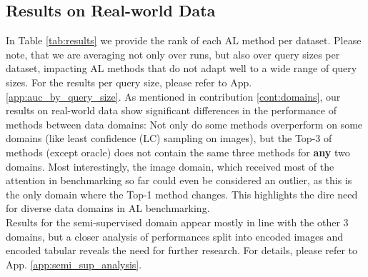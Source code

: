 \documentclass[]{article}
\begin{document}
\subsection{Results on Real-world Data}
In Table \ref{tab:results} we provide the rank of each AL method per dataset. 
Please note, that we are averaging not only over runs, but also over query sizes per dataset, impacting AL methods that do not adapt well to a wide range of query sizes.
For the results per query size, please refer to App. \ref{app:auc_by_query_size}. 
As mentioned in contribution \ref{cont:domains}, our results on real-world data show significant differences in the performance of methods between data domains:
Not only do some methods overperform on some domains (like least confidence (LC) sampling on images), but the Top-3 of methods (except oracle) does not contain the same three methods for \textbf{any} two domains.
Most interestingly, the image domain, which received most of the attention in benchmarking so far could even be considered an outlier, as this is the only domain where the Top-1 method changes.
This highlights the dire need for diverse data domains in AL benchmarking. \\
Results for the semi-supervised domain appear mostly in line with the other 3 domains, but a closer analysis of performances split into encoded images and encoded tabular reveals the need for further research.
For details, please refer to App. \ref{app:semi_sup_analysis}.
\end{document}
